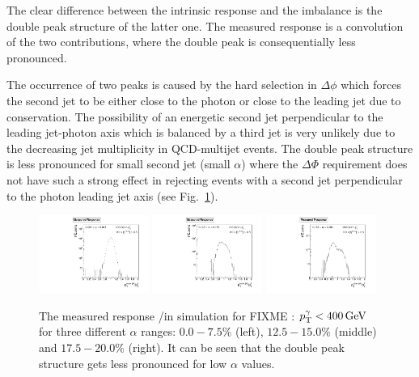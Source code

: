 The clear difference between the intrinsic response and the imbalance is the double peak structure of the latter one. The measured response is a convolution of the two
contributions, where the double peak is consequentially less pronounced.

The occurrence of two peaks is caused by the hard selection in $\Delta \phi$ which forces the second jet to be either close to the photon or close to the leading jet 
due to \pt conservation. 
The possibility of an energetic second jet perpendicular to the leading jet-photon axis which is balanced by a third jet is very unlikely 
due to the decreasing jet multiplicity in QCD-multijet events.
The double peak structure is less pronounced for small second jet \pt (small $\alpha$) where the $\Delta \Phi$ requirement does not have such a strong effect in rejecting
events with a second jet perpendicular to the photon leading jet axis (see \mbox{Fig. \ref{fig:alphaBins}}).

\begin{figure}[bt]
 \centering
     \includegraphics[width=0.32\textwidth]{figures/resolution/methodology/fullResponseExample1stBin.pdf}
     \includegraphics[width=0.32\textwidth]{figures/resolution/methodology/fullResponseExample4thBin.pdf}
     \includegraphics[width=0.32\textwidth]{figures/resolution/methodology/fullResponseExample6thBin.pdf}
  \caption{The measured response \ptrecojet/\ptgamma in simulation for FIXME : ${p}_\mathrm{T}^{\gamma} < 400 \,\text{Ge}\kern-0.06667em\text{V}$ for three different $\alpha$ ranges: $0.0-7.5\%$ (left), $12.5-15.0\%$ (middle) and $17.5-20.0\%$ (right). 
           It can be seen that the double peak structure gets less pronounced for low $\alpha$ values.}  
 \label{fig:alphaBins}
\end{figure}

